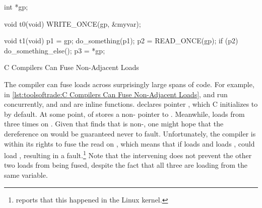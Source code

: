 \begin{listing}
\begin{fcvlabel}
\begin{VerbatimL}[commandchars=\\\[\]]
int *gp; \lnlbl[gp]

void t0(void)
{
	WRITE_ONCE(gp, &myvar); \lnlbl[wgp]
}

void t1(void)
{
	p1 = gp; \lnlbl[p1]
	do_something(p1);
	p2 = READ_ONCE(gp); \lnlbl[p2]
	if (p2) { \lnlbl[if]
		do_something_else();
		p3 = *gp; \lnlbl[p3]
	}
}
\end{VerbatimL}
\end{fcvlabel}
\caption{C Compilers Can Fuse Non-Adjacent Loads}
\label{lst:toolsoftrade:C Compilers Can Fuse Non-Adjacent Loads}
\end{listing}

\begin{fcvref}
The compiler can fuse loads across surprisingly large spans of code.
For example, in
\cref{lst:toolsoftrade:C Compilers Can Fuse Non-Adjacent Loads},
 and  run concurrently, and  and
 are inline functions.
 declares pointer , which C initializes to 
by default.
At some point,  of  stores a non-
pointer to .
Meanwhile,  loads from  three times on
.
Given that  finds that  is non-, one might
hope that the dereference on  would be guaranteed never
to fault.
Unfortunately, the compiler is within its rights to fuse the read on
, which means that if 
loads  and  loads , 
could load , resulting in a fault.\footnote{
	 reports that this happened in the Linux kernel.}
Note that the intervening  does not prevent the other
two loads from being fused, despite the fact that all three are loading
from the same variable.
\end{fcvref}

\QuickQuizEnd

